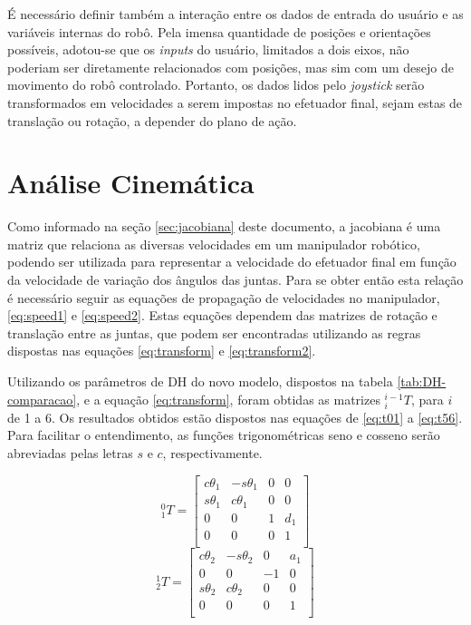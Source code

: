 É necessário definir também a interação entre os dados de entrada do usuário e 
as variáveis internas do robô. Pela imensa quantidade de posições e orientações possíveis, 
adotou-se que os \textit{inputs} do usuário, limitados a dois eixos, não poderiam ser diretamente relacionados
com posições, mas sim com um desejo de movimento do robô controlado. Portanto, 
os dados lidos pelo \textit{joystick} serão transformados em velocidades a serem impostas
no efetuador final, sejam estas de translação ou rotação, a depender do plano de ação.

\section{Análise Cinemática}
\label{sec:analise-cinematica}

Como informado na seção \ref{sec:jacobiana} deste documento, a jacobiana
é uma matriz que relaciona as diversas velocidades em um manipulador 
robótico, podendo ser utilizada para representar a velocidade do efetuador final
em função da velocidade de variação dos ângulos das juntas.
Para se obter então esta relação é necessário seguir as equações de propagação
de velocidades no manipulador, \ref{eq:speed1} e \ref{eq:speed2}.
Estas equações dependem das matrizes de rotação e translação entre as 
juntas, que podem ser encontradas utilizando as regras dispostas nas 
equações \ref{eq:transform} e \ref{eq:transform2}.

Utilizando os parâmetros de DH do novo modelo, dispostos na tabela \ref{tab:DH-comparacao},
e a equação \ref{eq:transform}, foram obtidas as matrizes $^{i-1}_iT$, para $i$ de 1 a 6. 
Os resultados obtidos estão dispostos nas equações de \ref{eq:t01} a \ref{eq:t56}.
Para facilitar o entendimento, as funções trigonométricas seno e cosseno serão abreviadas pelas
letras $s$ e $c$, respectivamente.

\begin{multicols}{2}
    \noindent
    \begin{equation}
        \label{eq:t01}
        ^0_1T = \begin{bmatrix}
                    c\theta_1 & -s\theta_1 & 0 & 0 \\
                    s\theta_1 & c\theta_1 & 0 & 0 \\
                    0 & 0 & 1 & d_1 \\
                    0 & 0 & 0 & 1 \\
                \end{bmatrix}
    \end{equation}
    \begin{equation}
        ^1_2T = \begin{bmatrix}
                    c\theta_2 & -s\theta_2 & 0 & a_1 \\
                    0 & 0 & -1 & 0 \\
                    s\theta_2 & c\theta_2 & 0 & 0 \\
                    0 & 0 & 0 & 1 \\
                \end{bmatrix}
    \end{equation}
\end{multicols}

